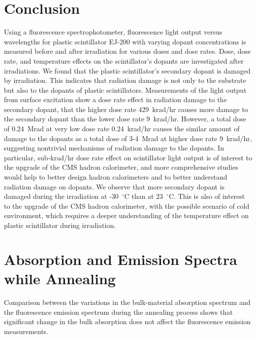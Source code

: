 \documentclass[review]{elsarticle}
\begin{document}
\section{Conclusion}
Using a fluorescence spectrophotometer, fluorescence light output versus wavelengths for plastic scintillator EJ-200 with varying 
dopant concentrations is measured before and after irradiation for various doses and dose rates. 
Dose, dose rate, and temperature effects on the scintillator's dopants are investigated after irradiations.
We found that the plastic scintillator's secondary dopant is damaged by irradiation. 
This indicates that radiation damage is not only to the substrate but also to the dopants of plastic scintillators. 
Measurements of the light output from surface excitation show a dose rate effect in radiation damage to the secondary dopant, 
that the higher dose rate 429~krad/hr causes more damage to the secondary dopant than the lower dose rate 9~krad/hr. 
However, a total dose of 0.24~Mrad at very low dose rate 0.24~krad/hr causes the similar amount of damage to the dopants as 
a total dose of 3-4~Mrad at higher dose rate 9~krad/hr, suggesting nontrivial mechanisms of radiation damage to the dopants. 
In particular, sub-krad/hr dose rate effect on scintillator light output is of interest to the upgrade of the CMS hadron calorimeter, 
and more comprehensive studies would help to better design hadron calorimeters and to better understand radiation damage on dopants.
We observe that more secondary dopant is damaged during the irradiation at -30~$^\circ$C than at 23~$^\circ$C. 
This is also of interest to the upgrade of the CMS hadron calorimeter, with the possible scenario of cold environment, 
which requires a deeper understanding of the temperature effect on plastic scintillator during irradiation. 


\appendix

\section{Absorption and Emission Spectra while Annealing}

Comparison between the variations in the bulk-material absorption spectrum and the fluorescence emission spectrum 
during the annealing process shows that significant change in the bulk absorption does not affect the fluorescence emission measurements. 
\end{document}
